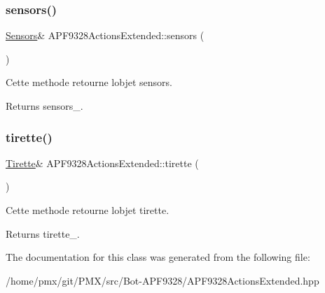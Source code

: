 \subsubsection{\texorpdfstring{sensors()}{sensors()}}
{\footnotesize\ttfamily \hyperlink{classSensors}{Sensors}\& A\+P\+F9328\+Actions\+Extended\+::sensors (\begin{DoxyParamCaption}{ }\end{DoxyParamCaption})\hspace{0.3cm}{\ttfamily [inline]}}



Cette methode retourne l\textquotesingle{}objet sensors. 

\begin{DoxyReturn}{Returns}
sensors\+\_\+. 
\end{DoxyReturn}
\mbox{\label{classAPF9328ActionsExtended_aaf101fe098410bb891706249a064c8e7}} 
\subsubsection{\texorpdfstring{tirette()}{tirette()}}
{\footnotesize\ttfamily \hyperlink{classTirette}{Tirette}\& A\+P\+F9328\+Actions\+Extended\+::tirette (\begin{DoxyParamCaption}{ }\end{DoxyParamCaption})\hspace{0.3cm}{\ttfamily [inline]}}



Cette methode retourne l\textquotesingle{}objet tirette. 

\begin{DoxyReturn}{Returns}
tirette\+\_\+. 
\end{DoxyReturn}


The documentation for this class was generated from the following file\+:\begin{DoxyCompactItemize}
\item 
/home/pmx/git/\+P\+M\+X/src/\+Bot-\/\+A\+P\+F9328/A\+P\+F9328\+Actions\+Extended.\+hpp\end{DoxyCompactItemize}
